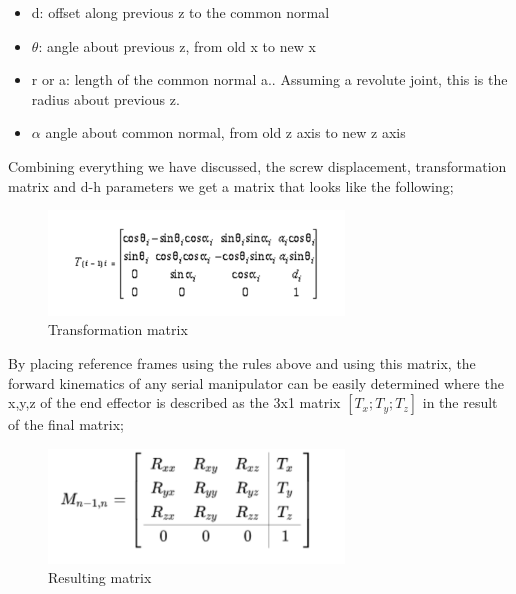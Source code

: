     \begin{itemize}
        \item d: offset along previous  z to the common normal
        \item $\theta$: angle about previous z, from old x to new x
        \item r or a: length of the common normal a.. Assuming a revolute joint, this is the radius about previous z.
        \item $\alpha$ angle about common normal, from old z axis to new z axis
    \end{itemize}
    Combining everything we have discussed, the screw displacement, transformation matrix and d-h parameters we get a matrix that looks like the following;
     \begin{figure}[H]
        \centering
        \includegraphics[width=0.7\textwidth]{Matrizx.PNG}
        \caption{Transformation matrix}
        \label{fig:my_label}
    \end{figure}
    By placing reference frames using the rules above and using this matrix, the forward kinematics of any serial manipulator can be easily determined where the x,y,z of the end effector is described as the 3x1 matrix $[T_x; T_y; T_z]$ in the result of the final matrix; 
     \begin{figure}[H]
        \centering
        \includegraphics[width=0.7\textwidth]{Matrix2.PNG}
        \caption{Resulting matrix}
        \label{fig:my_label}
    \end{figure}
